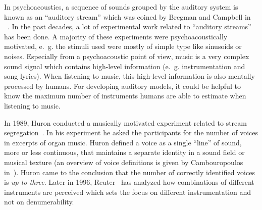 In psychoacoustics, a sequence of sounds grouped by the auditory system is known as an ``auditory stream'' which was coined by Bregman and Campbell in ~\cite{Bregman1971}. 
In the past decades, a lot of experimental work related to ``auditory streams'' has been done\cite{Bregman1990}. 
A majority of these experiments were psychoacoustically motivated, e.~g. the stimuli used were mostly of simple type like sinusoids or noises. 
Especially from a psychoacoustic point of view, music is a very complex sound signal which contains high-level information (e.~g. instrumentation and song lyrics).
When listening to music, this high-level information is also mentally processed by humans. 
For developing auditory models, it could be helpful to know the maximum number of instruments humans are able to estimate when listening to music.
\par
In 1989, Huron conducted a musically motivated experiment related to stream segregation~\cite{Huron1989}. In his experiment he asked the participants for the number of voices in excerpts of organ music. 
Huron defined a voice as a single ``line'' of sound, more or less continuous, that maintains a separate identity in a sound field or musical texture (an overview of voice definitions is given by Cambouropoulos in~\cite{Cambouropoulos2008}). 
Huron came to the conclusion that the number of correctly identified voices is \emph{up to three}. 
Later in 1996, Reuter~\cite{reuter96} has analyzed how combinations of different instruments are perceived which sets the focus on different instrumentation and not on denumerability.


